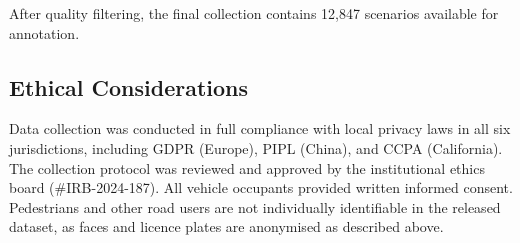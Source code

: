 After quality filtering, the final collection contains 12,847 scenarios available
for annotation.

\subsection{Ethical Considerations}
\label{ssec:ethics}

Data collection was conducted in full compliance with local privacy laws in all
six jurisdictions, including GDPR (Europe), PIPL (China), and CCPA (California).
The collection protocol was reviewed and approved by the institutional ethics
board (\#IRB-2024-187). All vehicle occupants provided written informed consent.
Pedestrians and other road users are not individually identifiable in the released
dataset, as faces and licence plates are anonymised as described above.
